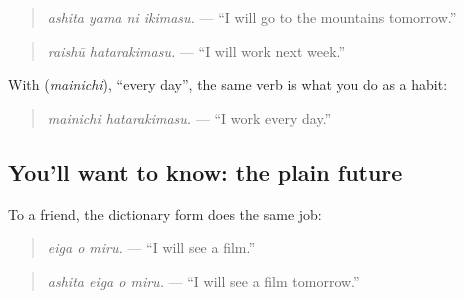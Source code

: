 \begin{quote}
\textbf{  }
\end{quote}

\begin{quote}
\emph{ashita yama ni ikimasu.} — \textquotedblleft{}I will go to the mountains tomorrow.\textquotedblright{}
\end{quote}

\begin{quote}
\textbf{ }
\end{quote}

\begin{quote}
\emph{raishū hatarakimasu.} — \textquotedblleft{}I will work next week.\textquotedblright{}
\end{quote}

With \textbf{} (\emph{mainichi}), \textquotedblleft{}every day\textquotedblright{}, the same verb is what you do as a habit:

\begin{quote}
\textbf{ }
\end{quote}

\begin{quote}
\emph{mainichi hatarakimasu.} — \textquotedblleft{}I work every day.\textquotedblright{}
\end{quote}

\subsection*{You'll want to know: the plain future}
To a friend, the dictionary form does the same job:

\begin{quote}
\textbf{ }
\end{quote}

\begin{quote}
\emph{eiga o miru.} — \textquotedblleft{}I will see a film.\textquotedblright{}
\end{quote}

\begin{quote}
\textbf{  }
\end{quote}

\begin{quote}
\emph{ashita eiga o miru.} — \textquotedblleft{}I will see a film tomorrow.\textquotedblright{}
\end{quote}

